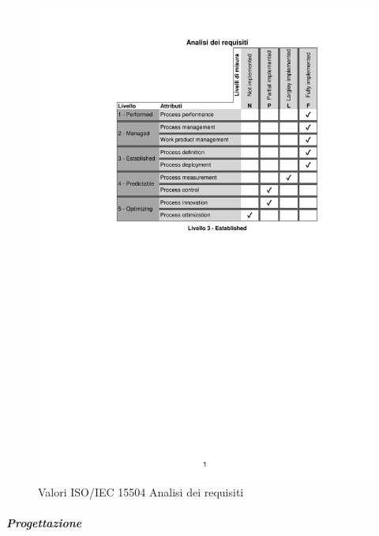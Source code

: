 \begin{figure}[H]
	\centering
	\includegraphics[scale=1]{images/resoconto/RP/analisideirequisiti-RP.pdf}
	\caption{Valori ISO/IEC 15504 Analisi dei requisiti}	
\end{figure}
\newpage
\subparagraph{Progettazione}
\noindent
